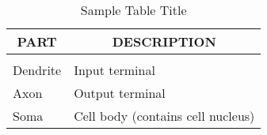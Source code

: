 \documentclass[letterpaper]{article}
\begin{document}
\begin{table}[h]
\caption{Sample Table Title}
\label{sample-table}
\begin{center}
\begin{tabular}{ll}
\multicolumn{1}{c}{\bf PART}  &\multicolumn{1}{c}{\bf DESCRIPTION} \\
\hline \\
Dendrite         &Input terminal \\
Axon             &Output terminal \\
Soma             &Cell body (contains cell nucleus) \\
\end{tabular}
\end{center}
\end{table}

{\small


}
\end{document}
